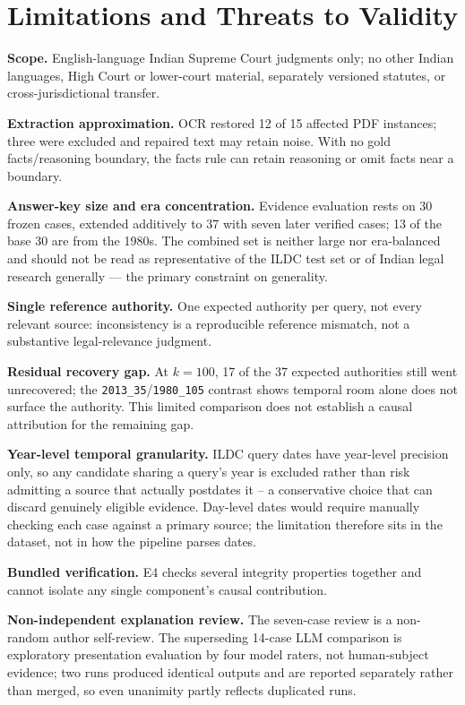 \documentclass[conference]{IEEEtran}
\begin{document}
\section{Limitations and Threats to Validity}
\label{sec:limits}

\textbf{Scope.} English-language Indian Supreme Court judgments
only; no other Indian languages, High Court or lower-court
material, separately versioned statutes, or cross-jurisdictional transfer.

\textbf{Extraction approximation.} OCR restored 12 of 15 affected PDF
instances; three were excluded and repaired text may retain noise. With
no gold facts/reasoning boundary, the facts rule can
retain reasoning or omit facts near a boundary.

\textbf{Answer-key size and era concentration.} Evidence evaluation rests on
30 frozen cases, extended additively to 37 with seven later
verified cases; 13 of the base 30 are from
the 1980s. The combined set is neither large nor era-balanced and should not
be read as representative of the ILDC test set or of
Indian legal research generally --- the primary constraint on
generality.

\textbf{Single reference authority.} One expected authority per
query, not every relevant source: inconsistency is a reproducible
reference mismatch, not a substantive legal-relevance judgment.

\textbf{Residual recovery gap.} At $k{=}100$, 17 of the 37 expected authorities
still went unrecovered; the \texttt{2013\_35}/\texttt{1980\_105} contrast shows
temporal room alone does not surface the authority. This limited comparison
does not establish a causal attribution for the remaining gap.

\textbf{Year-level temporal granularity.} ILDC query dates have
year-level precision only, so any candidate sharing a query's year
is excluded rather than risk admitting a source that actually postdates it --
a conservative choice that can discard genuinely eligible evidence. Day-level
dates would require manually checking each case against a primary
source; the limitation
therefore sits in the dataset, not in how the pipeline parses dates.

\textbf{Bundled verification.} E4 checks several integrity properties together
and cannot isolate any single component's causal contribution.

\textbf{Non-independent explanation review.} The seven-case review is a
non-random author self-review. The superseding 14-case LLM comparison is exploratory
presentation evaluation by four model raters, not human-subject evidence;
two runs produced identical outputs and are reported separately
rather than merged, so even unanimity partly reflects
duplicated runs.
\end{document}
